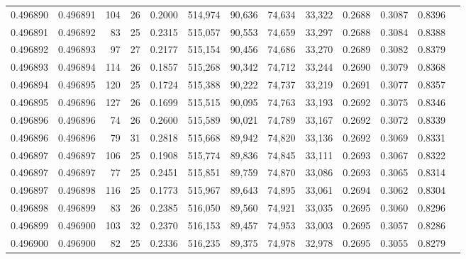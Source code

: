 \begin{tabular}{rrrrrrrrrrrrr}
0.496890 & 0.496891 & 104 &  26 &                                     0.2000 & 514,974 &  90,636 &  74,634 &  33,322 & 0.2688 & 0.3087 & 0.8396 \\
0.496891 & 0.496892 &  83 &  25 &                                     0.2315 & 515,057 &  90,553 &  74,659 &  33,297 & 0.2688 & 0.3084 & 0.8388 \\
0.496892 & 0.496893 &  97 &  27 &                                     0.2177 & 515,154 &  90,456 &  74,686 &  33,270 & 0.2689 & 0.3082 & 0.8379 \\
0.496893 & 0.496894 & 114 &  26 &                                     0.1857 & 515,268 &  90,342 &  74,712 &  33,244 & 0.2690 & 0.3079 & 0.8368 \\
0.496894 & 0.496895 & 120 &  25 &                                     0.1724 & 515,388 &  90,222 &  74,737 &  33,219 & 0.2691 & 0.3077 & 0.8357 \\
0.496895 & 0.496896 & 127 &  26 &                                     0.1699 & 515,515 &  90,095 &  74,763 &  33,193 & 0.2692 & 0.3075 & 0.8346 \\
0.496896 & 0.496896 &  74 &  26 &                                     0.2600 & 515,589 &  90,021 &  74,789 &  33,167 & 0.2692 & 0.3072 & 0.8339 \\
0.496896 & 0.496896 &  79 &  31 &                                     0.2818 & 515,668 &  89,942 &  74,820 &  33,136 & 0.2692 & 0.3069 & 0.8331 \\
0.496897 & 0.496897 & 106 &  25 &                                     0.1908 & 515,774 &  89,836 &  74,845 &  33,111 & 0.2693 & 0.3067 & 0.8322 \\
0.496897 & 0.496897 &  77 &  25 &                                     0.2451 & 515,851 &  89,759 &  74,870 &  33,086 & 0.2693 & 0.3065 & 0.8314 \\
0.496897 & 0.496898 & 116 &  25 &                                     0.1773 & 515,967 &  89,643 &  74,895 &  33,061 & 0.2694 & 0.3062 & 0.8304 \\
0.496898 & 0.496899 &  83 &  26 &                                     0.2385 & 516,050 &  89,560 &  74,921 &  33,035 & 0.2695 & 0.3060 & 0.8296 \\
0.496899 & 0.496900 & 103 &  32 &                                     0.2370 & 516,153 &  89,457 &  74,953 &  33,003 & 0.2695 & 0.3057 & 0.8286 \\
0.496900 & 0.496900 &  82 &  25 &                                     0.2336 & 516,235 &  89,375 &  74,978 &  32,978 & 0.2695 & 0.3055 & 0.8279 \\

\end{tabular}

